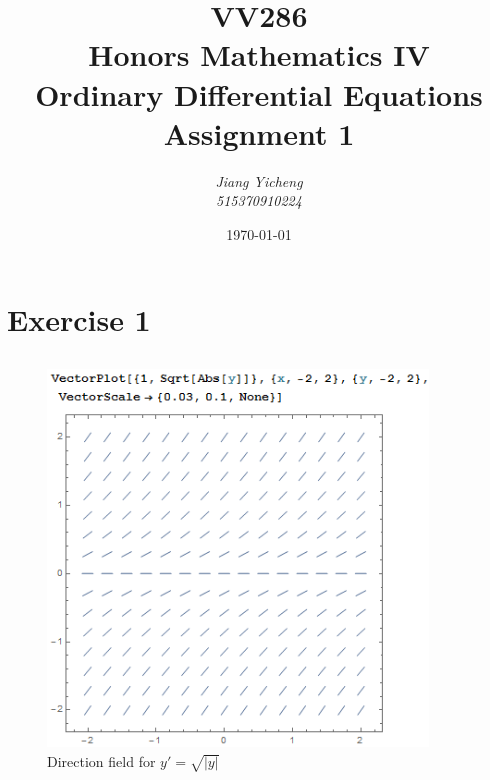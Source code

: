 \documentclass[a4paper,12pt,titlepage]{article}
\author{\textit{Jiang Yicheng}\\\textit{515370910224}}
\title{\textbf{VV286\\ Honors Mathematics IV\\
Ordinary Differential Equations\\
		Assignment 1}}
\date{\today}
\begin{document}
\maketitle


\section{Exercise 1}
\subsection{}
\begin{figure}[ht]
	\centering
	\includegraphics[height=10cm]{1.png}
	\caption{Direction field for $y'=\sqrt{|y|}$}  
\end{figure}
\end{document}
